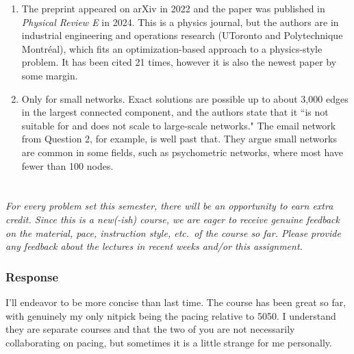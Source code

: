\documentclass{article}
\newcommand{\response}{\subsubsection*{Response}}
\newcommand{\nc}[1]{(#1)}
\begin{document}
\begin{enumerate}
\begin{itemize}
\begin{enumerate}
            \begin{enumerate}
                \item[\nc 1] Drop the requirement that the variables be integers (an linear programming relaxation), then solve with the commercial solver Gurobi. This gives an upper bound on the modularity.
                \item[\nc 2] A fast heuristic partition (Combo, although I suspect others can be used) gives a lower bound.
                \item[\nc 3] Branch on a triple of nodes whose LP solution violates the constraints: in one branch all three are in the same community (merged into a supernode), and in the other at least two of the three pairs are separated. Repeat the bounds on each branch.
                \item[\nc 4] Close a branch when its LP solution becomes integer, infeasible, or worse than the best partition found so far.
            \end{enumerate}
            When the best partition found equals the upper bound, it is provably optimal. Stopping earlier, on a time limit or a gap tolerance, gives the approximate version.
            \item The preprint appeared on arXiv in 2022 and the paper was published in \textit{Physical Review E} in 2024. This is a physics journal, but the authors are in industrial engineering and operations research (UToronto and Polytechnique Montréal), which fits an optimization-based approach to a physics-style problem. It has been cited 21 times, however it is also the newest paper by some margin. 
            \item Only for small networks. Exact solutions are possible up to about 3,000 edges in the largest connected component, and the authors state that it ``is not suitable for and does not scale to large-scale networks." The email network from Question 2, for example, is well past that. They argue small networks are common in some fields, such as psychometric networks, where most have fewer than 100 nodes. 
        \end{enumerate}
    \end{itemize}
\end{enumerate}


\clearpage
\section{}
\textit{For every problem set this semester, there will be an opportunity to earn extra credit. Since this is a new(-ish) course, we are eager to receive genuine feedback on the material, pace, instruction style, etc.\ of the course so far. Please provide any feedback about the lectures in recent weeks and/or this assignment.}
\response
I'll endeavor to be more concise than last time. The course has been great so far, with genuinely my only nitpick being the pacing relative to 5050. I understand they are separate courses and that the two of you are not necessarily collaborating on pacing, but sometimes it is a little strange for me personally. 
\end{document}
